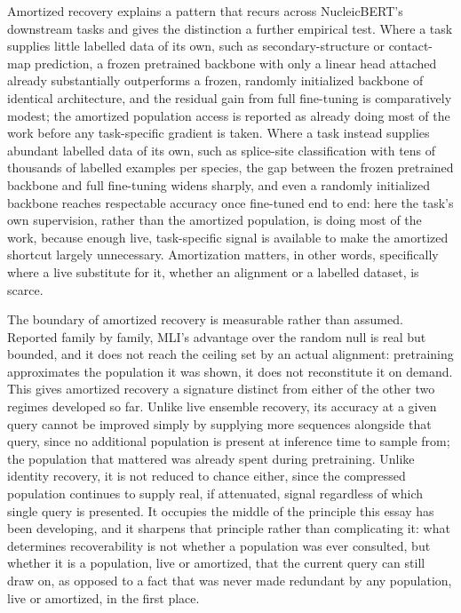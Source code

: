 \documentclass[11pt]{article}
\begin{document}
Amortized recovery explains a pattern that recurs across NucleicBERT's downstream tasks and gives the distinction a further empirical test. Where a task supplies little labelled data of its own, such as secondary-structure or contact-map prediction, a frozen pretrained backbone with only a linear head attached already substantially outperforms a frozen, randomly initialized backbone of identical architecture, and the residual gain from full fine-tuning is comparatively modest; the amortized population access is reported as already doing most of the work before any task-specific gradient is taken. Where a task instead supplies abundant labelled data of its own, such as splice-site classification with tens of thousands of labelled examples per species, the gap between the frozen pretrained backbone and full fine-tuning widens sharply, and even a randomly initialized backbone reaches respectable accuracy once fine-tuned end to end: here the task's own supervision, rather than the amortized population, is doing most of the work, because enough live, task-specific signal is available to make the amortized shortcut largely unnecessary. Amortization matters, in other words, specifically where a live substitute for it, whether an alignment or a labelled dataset, is scarce.

The boundary of amortized recovery is measurable rather than assumed. Reported family by family, MLI's advantage over the random null is real but bounded, and it does not reach the ceiling set by an actual alignment: pretraining approximates the population it was shown, it does not reconstitute it on demand. This gives amortized recovery a signature distinct from either of the other two regimes developed so far. Unlike live ensemble recovery, its accuracy at a given query cannot be improved simply by supplying more sequences alongside that query, since no additional population is present at inference time to sample from; the population that mattered was already spent during pretraining. Unlike identity recovery, it is not reduced to chance either, since the compressed population continues to supply real, if attenuated, signal regardless of which single query is presented. It occupies the middle of the principle this essay has been developing, and it sharpens that principle rather than complicating it: what determines recoverability is not whether a population was ever consulted, but whether it is a population, live or amortized, that the current query can still draw on, as opposed to a fact that was never made redundant by any population, live or amortized, in the first place.
\end{document}
